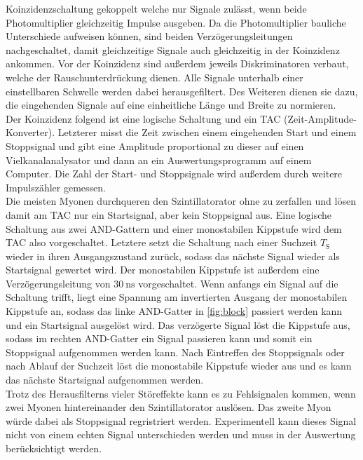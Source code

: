 Koinzidenzschaltung gekoppelt welche nur Signale zulässt, wenn beide Photomultiplier gleichzeitig Impulse
ausgeben. Da die Photomultiplier bauliche Unterschiede aufweisen können, sind beiden Verzögerungsleitungen
nachgeschaltet, damit gleichzeitige Signale auch gleichzeitig in der Koinzidenz ankommen.
Vor der Koinzidenz sind außerdem jeweils Diskriminatoren verbaut, welche der Rauschunterdrückung dienen.
Alle Signale unterhalb einer einstellbaren Schwelle werden dabei herausgefiltert.
Des Weiteren dienen sie dazu, die eingehenden Signale auf eine einheitliche Länge und Breite zu normieren.\\
Der Koinzidenz folgend ist eine logische Schaltung und ein TAC (Zeit-Amplitude-Konverter). Letzterer misst die
Zeit zwischen einem eingehenden Start und einem Stoppsignal und gibt eine Amplitude proportional
zu dieser auf einen Vielkanalanalysator und dann an ein Auswertungsprogramm auf einem Computer.
Die Zahl der Start- und Stoppsignale wird außerdem durch weitere Impulszähler gemessen. \\
Die meisten Myonen durchqueren den Szintillatorator ohne zu zerfallen und lösen damit am TAC nur ein Startsignal,
aber kein Stoppsignal aus. Eine logische Schaltung aus zwei AND-Gattern und einer monostabilen Kippstufe wird dem TAC
also vorgeschaltet. Letztere setzt die Schaltung nach einer Suchzeit $T_{\text{S}}$ wieder in ihren
Ausgangszustand zurück, sodass das nächste Signal wieder als Startsignal gewertet wird.
Der monostabilen Kippstufe ist außerdem eine Verzögerungsleitung von $\SI{30}{\nano\second}$ vorgeschaltet.
Wenn anfangs ein Signal auf die Schaltung trifft, liegt eine Spannung am invertierten Ausgang der monostabilen Kippstufe an,
sodass das linke AND-Gatter in \autoref{fig:block} passiert werden kann und ein Startsignal ausgelöst wird. Das verzögerte Signal löst
die Kippstufe aus, sodass im rechten AND-Gatter ein Signal passieren kann und somit ein Stoppsignal aufgenommen werden kann.
Nach Eintreffen des Stoppsignals oder nach Ablauf der Suchzeit löst die monostabile Kippstufe wieder aus und
es kann das nächste Startsignal aufgenommen werden. \\
Trotz des Herausfilterns vieler Störeffekte kann es zu Fehlsignalen kommen, wenn zwei Myonen hintereinander
den Szintillatorator auslösen. Das zweite Myon würde dabei als Stoppsignal regristriert werden. Experimentell kann
dieses Signal nicht von einem echten Signal unterschieden werden und muss in der Auswertung berücksichtigt werden.

